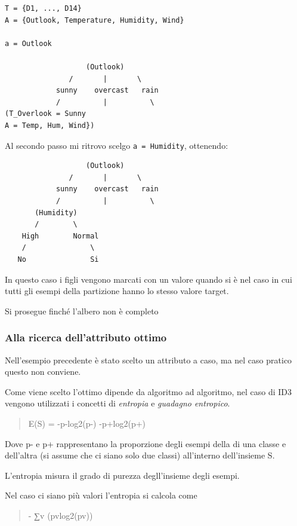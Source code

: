 \begin{verbatim}
T = {D1, ..., D14}
A = {Outlook, Temperature, Humidity, Wind}

a = Outlook

                   (Outlook)
               /       |       \
            sunny    overcast   rain
            /          |          \
(T_Overlook = Sunny
A = Temp, Hum, Wind})
\end{verbatim}

Al secondo passo mi ritrovo scelgo \texttt{a\ =\ Humidity}, ottenendo:

\begin{verbatim}
                   (Outlook)
               /       |       \
            sunny    overcast   rain
            /          |          \
       (Humidity)
       /        \
    High        Normal
    /               \
   No               Si
\end{verbatim}

In questo caso i figli vengono marcati con un valore quando si è nel
caso in cui tutti gli esempi della partizione hanno lo stesso valore
target.

Si prosegue finché l'albero non è completo

\subsubsection{Alla ricerca dell'attributo
ottimo}\label{alla-ricerca-dellattributo-ottimo}

Nell'esempio precedente è stato scelto un attributo a caso, ma nel caso
pratico questo non conviene.

Come viene scelto l'ottimo dipende da algoritmo ad algoritmo, nel caso
di ID3 vengono utilizzati i concetti di \emph{entropia} e \emph{guadagno
entropico}.

\begin{quote}
E(S) = -p-log2(p-) -p+log2(p+)
\end{quote}

Dove p- e p+ rappresentano la proporzione degli esempi della di una
classe e dell'altra (si assume che ci siano solo due classi) all'interno
dell'insieme S.

L'entropia misura il grado di purezza degll'insieme degli esempi.

Nel caso ci siano più valori l'entropia si calcola come

\begin{quote}
- ∑v (pvlog2(pv))
\end{quote}

